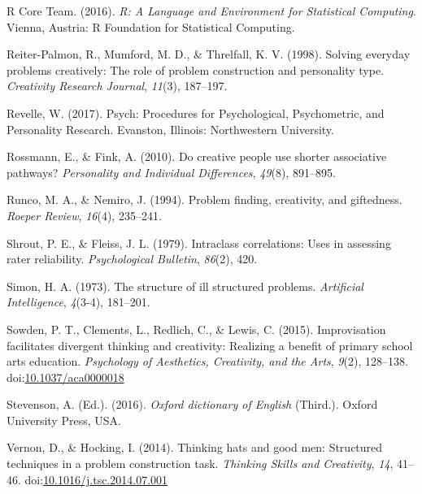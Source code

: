 \documentclass[english,man]{apa6}
\begin{document}
\leavevmode\hypertarget{ref-R-base}{}%
R Core Team. (2016). \emph{R: A Language and Environment for Statistical
Computing}. Vienna, Austria: R Foundation for Statistical Computing.

\leavevmode\hypertarget{ref-reiter-palmon_solving_1998}{}%
Reiter-Palmon, R., Mumford, M. D., \& Threlfall, K. V. (1998). Solving
everyday problems creatively: The role of problem construction and
personality type. \emph{Creativity Research Journal}, \emph{11}(3),
187--197.

\leavevmode\hypertarget{ref-RevellepsychProceduresPsychological2017}{}%
Revelle, W. (2017). Psych: Procedures for Psychological, Psychometric,
and Personality Research. Evanston, Illinois: Northwestern University.

\leavevmode\hypertarget{ref-rossmann2010creative}{}%
Rossmann, E., \& Fink, A. (2010). Do creative people use shorter
associative pathways? \emph{Personality and Individual Differences},
\emph{49}(8), 891--895.

\leavevmode\hypertarget{ref-runco1994problem}{}%
Runco, M. A., \& Nemiro, J. (1994). Problem finding, creativity, and
giftedness. \emph{Roeper Review}, \emph{16}(4), 235--241.

\leavevmode\hypertarget{ref-shrout_intraclass_1979}{}%
Shrout, P. E., \& Fleiss, J. L. (1979). Intraclass correlations: Uses in
assessing rater reliability. \emph{Psychological Bulletin},
\emph{86}(2), 420.

\leavevmode\hypertarget{ref-Simonstructureillstructured1973}{}%
Simon, H. A. (1973). The structure of ill structured problems.
\emph{Artificial Intelligence}, \emph{4}(3-4), 181--201.

\leavevmode\hypertarget{ref-sowden_improvisation_2015}{}%
Sowden, P. T., Clements, L., Redlich, C., \& Lewis, C. (2015).
Improvisation facilitates divergent thinking and creativity: Realizing a
benefit of primary school arts education. \emph{Psychology of
Aesthetics, Creativity, and the Arts}, \emph{9}(2), 128--138.
doi:\href{https://doi.org/10.1037/aca0000018}{10.1037/aca0000018}

\leavevmode\hypertarget{ref-stevenson2010oxford}{}%
Stevenson, A. (Ed.). (2016). \emph{Oxford dictionary of English}
(Third.). Oxford University Press, USA.

\leavevmode\hypertarget{ref-vernon_thinking_2014}{}%
Vernon, D., \& Hocking, I. (2014). Thinking hats and good men:
Structured techniques in a problem construction task. \emph{Thinking
Skills and Creativity}, \emph{14}, 41--46.
doi:\href{https://doi.org/10.1016/j.tsc.2014.07.001}{10.1016/j.tsc.2014.07.001}
\end{document}
